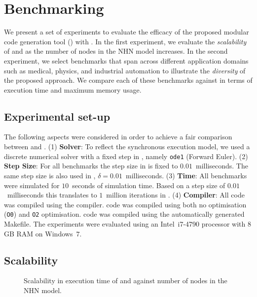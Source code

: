 \section{Benchmarking}
\label{sec:benchmarking}


We present a set of experiments to evaluate the efficacy of the proposed
modular code generation tool (\ourTool) with \simulink.  In the first 
experiment, we evaluate the \emph{scalability} of \ourTool and \simulink as the 
number of nodes in the \ac{NHN} model increases.  In the second experiment, we 
select benchmarks that span across different application domains such as 
medical, physics, and industrial automation to illustrate the \emph{diversity} 
of the proposed approach.  We compare each of these benchmarks against 
\simulink in terms of execution time and maximum memory usage.  


\subsection{Experimental set-up}
\label{sec:experimentalSetUp}
The following aspects were considered in order to achieve a fair
comparison between \ourTool and \simulink. 
(1) \textbf{Solver}: To reflect the synchronous execution model, we
  used a discrete numerical solver with a fixed step in \simulink,
  namely \texttt{ode1} (Forward Euler).
(2) 
\textbf{Step Size}: For all benchmarks the step size in \simulink
  is fixed to $0.01$~milliseconds.  The same step size is also used in
  \ourTool, $\delta = 0.01$~milliseconds.
(3) 
\textbf{Time}: All benchmarks were simulated for $10$~seconds of
  simulation time.  Based on a step size of $0.01$~milliseconds this
  translates to $1$~million iterations in \ourTool.
  (4)
\textbf{Compiler}: All code was compiled using the \compiler
  compiler.  \ourTool code was compiled using both no optimisation
  (\texttt{O0}) and \texttt{O2} optimisation.  \simulink code was
  compiled using the automatically generated Makefile.
The experiments were evaluated using an Intel~i7-4790 processor with
$8$\,GB RAM on Windows~$7$.


\subsection{Scalability}

\begin{figure}[htbp]
  \centering
  
  \setlength{\abovecaptionskip}{-10pt}
  \caption{Scalability in  execution time of \simulink and 
  \ourTool against number of nodes in the \acf{NHN} model.}
  \label{fig:scalability}
\end{figure}

